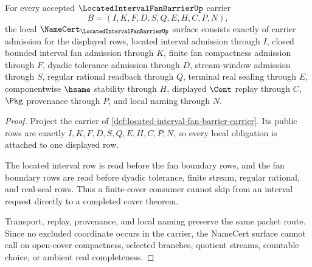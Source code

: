 \begin{theorem}
\label{thm:located-interval-fan-barrier-namecert-obligations}
For every accepted $\LocatedIntervalFanBarrierUp$ carrier
$$
B=(I,K,F,D,S,Q,E,H,C,P,N),
$$
the local $\NameCert_{\LocatedIntervalFanBarrierUp}$ surface consists exactly of carrier admission for the displayed rows, located interval admission through $I$, closed bounded interval fan admission through $K$, finite fan compactness admission through $F$, dyadic tolerance admission through $D$, stream-window admission through $S$, regular rational readback through $Q$, terminal real sealing through $E$, componentwise $\hsame$ stability through $H$, displayed $\Cont$ replay through $C$, $\Pkg$ provenance through $P$, and local naming through $N$.
\end{theorem}
\begin{proof}
Project the carrier of \autoref{def:located-interval-fan-barrier-carrier}. Its public rows are exactly $I,K,F,D,S,Q,E,H,C,P,N$, so every local obligation is attached to one displayed row.

The located interval row is read before the fan boundary rows, and the fan boundary rows are read before dyadic tolerance, finite stream, regular rational, and real-seal rows. Thus a finite-cover consumer cannot skip from an interval request directly to a completed cover theorem.

Transport, replay, provenance, and local naming preserve the same packet route. Since no excluded coordinate occurs in the carrier, the NameCert surface cannot call on open-cover compactness, selected branches, quotient streams, countable choice, or ambient real completeness.
\end{proof}

